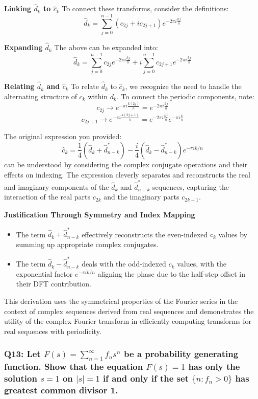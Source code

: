 \documentclass[8pt]{article}
\begin{document}
\textbf{Linking \(\hat{d}_k\) to \(\hat{c}_k\)}
To connect these transforms, consider the definitions:
\[
\hat{d}_k = \sum_{j=0}^{n-1} (c_{2j} + ic_{2j+1}) e^{-2\pi i \frac{kj}{n}}
\]

\textbf{Expanding \(\hat{d}_k\)}
The above can be expanded into:
\[
\hat{d}_k = \sum_{j=0}^{n-1} c_{2j} e^{-2\pi i \frac{kj}{n}} + i \sum_{j=0}^{n-1} c_{2j+1} e^{-2\pi i \frac{kj}{n}}
\]

\textbf{Relating \(\hat{d}_k\) and \(\hat{c}_k\)}
To relate \(\hat{d}_k\) to \(\hat{c}_k\), we recognize the need to handle the alternating structure of \(c_k\) within \(d_k\). To connect the periodic components, note:
\[
c_{2j} \rightarrow e^{-\pi i \frac{k(2j)}{n}} = e^{-2\pi i \frac{kj}{n}}
\]
\[
c_{2j+1} \rightarrow e^{-\pi i \frac{k(2j+1)}{n}} = e^{-2\pi i \frac{kj}{n}} e^{-\pi i \frac{k}{n}}
\]

The original expression you provided:
\[
\hat{c}_k = \frac{1}{4} \left( \hat{d}_k + \hat{d}^*_{n-k} \right) - \frac{i}{4} \left( \hat{d}_k - \hat{d}^*_{n-k} \right) e^{-\pi i k / n}
\]
can be understood by considering the complex conjugate operations and their effects on indexing. The expression cleverly separates and reconstructs the real and imaginary components of the \(\hat{d}_k\) and \(\hat{d}^*_{n-k}\) sequences, capturing the interaction of the real parts \(c_{2k}\) and the imaginary parts \(c_{2k+1}\).

\textbf{Justification Through Symmetry and Index Mapping}
\begin{itemize}
    \item The term \(\hat{d}_k + \hat{d}^*_{n-k}\) effectively reconstructs the even-indexed \(c_k\) values by summing up appropriate complex conjugates.
    \item The term \(\hat{d}_k - \hat{d}^*_{n-k}\) deals with the odd-indexed \(c_k\) values, with the exponential factor \(e^{-\pi i k / n}\) aligning the phase due to the half-step offset in their DFT contribution.
\end{itemize}

This derivation uses the symmetrical properties of the Fourier series in the context of complex sequences derived from real sequences and demonstrates the utility of the complex Fourier transform in efficiently computing transforms for real sequences with periodicity.

\subsubsection*{Q13:
Let \(F(s) = \sum_{n=1}^{\infty} f_n s^n\) be a probability generating function. Show that the equation \(F(s) = 1\) has only the solution \(s = 1\) on \(|s| = 1\) if and only if the set \(\{ n : f_n > 0 \}\) has greatest common divisor 1.}
\end{document}
